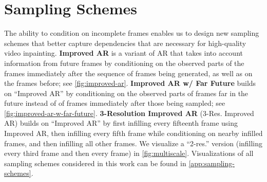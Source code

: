\section{Sampling Schemes}
The ability to condition on incomplete frames enables us to design new sampling schemes that better capture dependencies that are necessary for high-quality video inpainting. \textbf{Improved AR} is a variant of AR that takes into account information from future frames by conditioning on the observed parts of the frames immediately after the sequence of frames being generated, as well as on the frames before; see \cref{fig:improved-ar}. \textbf{Improved AR w/ Far Future} builds on ``Improved AR'' by conditioning on the observed parts of frames far in the future instead of of frames immediately after those being sampled; see \cref{fig:improved-ar-w-far-future}.
\textbf{3-Resolution Improved AR} (3-Res. Improved AR) builds on ``Improved AR'' by first infilling every fifteenth frame using Improved AR, then infilling every fifth frame while conditioning on nearby infilled frames, and then infilling all other frames. We visualize a ``2-res.'' version (infilling every third frame and then every frame) in \cref{fig:multiscale}. Visualizations of all sampling schemes considered in this work can be found in \cref{app:sampling-schemes}.




